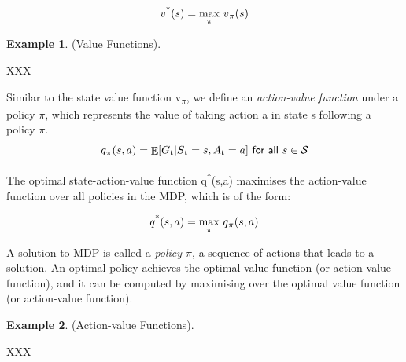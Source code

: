 \documentclass[11pt,twoside]{report}
\theoremstyle{plain}
\theoremstyle{definition}
\DeclareMathOperator{\E}{\mathbb{E}}
\newtheorem{examp}{Example}[section]
\begin{document}
\begin{equation}
v\textsuperscript{*}(s) = \underset{\pi}{\max} \ v\textsubscript{$\pi$}(s)
\end{equation}

\begin{examp} \normalfont (Value Functions).

XXX
\end{examp}

Similar to the state value function v\textsubscript{$\pi$},  we define an \textit{action-value function} under a policy $\pi$, which represents the value of taking action a in state s following a policy $\pi$. 
\begin{equation}
q\textsubscript{$\pi$}(s, a) = \displaystyle \E [G\textsubscript{t} \vert S\textsubscript{t} = s, A\textsubscript{t} = a] \ \textsf{for all}\ s \in \mathcal{S}
\end{equation}

The optimal state-action-value function q\textsuperscript{*}(s,a) maximises the action-value function over all policies in the MDP, which is of the form:

\begin{equation}
q\textsuperscript{*}(s, a) = \underset{\pi}{\max} \ q\textsubscript{$\pi$}(s, a)
\end{equation}

A solution to MDP is called a \textit{policy $\pi$}, a sequence of actions that leads to a solution. An optimal policy achieves the optimal value function (or action-value function), and it can be computed by maximising over the optimal value function (or action-value function).

\begin{examp} \normalfont (Action-value Functions).

XXX
\end{examp}



\end{document}
